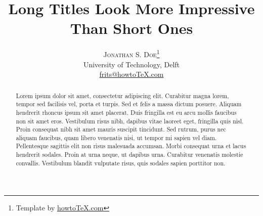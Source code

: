 \documentclass[twoside]{article}
\title{\vspace{-15mm}%
	\fontsize{24pt}{10pt}\selectfont
	\textbf{Long Titles Look More Impressive Than Short Ones}
	}
\author{%
	\large
	\textsc{Jonathan S. Doe}\thanks{Template by \href{http://www.howtotex.com}{howtoTeX.com}} \\[2mm]
	\normalsize	University of Technology, Delft \\
	\normalsize	\href{mailto:frits@howtoTeX.com}{frits@howtoTeX.com}
	\vspace{-5mm}
	}
\date{}
\begin{document}
\maketitle
\thispagestyle{fancy}

\begin{abstract}
\noindent Lorem ipsum dolor sit amet, consectetur adipiscing elit. Curabitur magna lorem, tempor sed facilisis vel, porta et turpis. Sed et felis a massa dictum posuere. Aliquam hendrerit rhoncus ipsum sit amet placerat. Duis fringilla est eu arcu mollis faucibus non sit amet eros. Vestibulum risus nibh, dapibus vitae laoreet eget, fringilla quis nisl. Proin consequat nibh sit amet mauris suscipit tincidunt. Sed rutrum, purus nec aliquam faucibus, quam libero venenatis nisi, ut tempor mi sapien vel diam. Pellentesque sagittis elit non risus malesuada accumsan. Morbi consequat urna et lacus hendrerit sodales. Proin at urna neque, ut dapibus urna. Curabitur venenatis molestie convallis. Vestibulum blandit vulputate risus, quis sodales sapien porttitor non.
\end{abstract}
	
\end{document}
